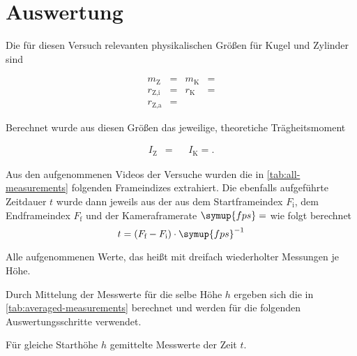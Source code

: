 \section{Auswertung}
\label{sec:Auswertung}


Die für diesen Versuch relevanten physikalischen Größen für Kugel und Zylinder sind 

\begin{align}
  \label{eq:physical-properties}
  m_\text{Z} &=  & m_\text{K} &= \nonumber\\
  r_{\text{Z},\text{i}} &=  & r_\text{K} &= \\
  r_{\text{Z},\text{a}} &=  &&\nonumber
\end{align}

Berechnet wurde aus diesen Größen das jeweilige, theoretiche Trägheitsmoment

\begin{align}
  \label{eq:moments-inertia}
  I_\text{Z} &=  && I_\text{K} = .
\end{align}



Aus den aufgenommenen Videos der Versuche wurden die in \autoref{tab:all-measurements} folgenden Frameindizes extrahiert.
Die ebenfalls aufgeführte Zeitdauer $t$ wurde dann jeweils aus der aus dem Startframeindex $F_\text{i}$,
dem Endframeindex $F_\text{f}$ und der Kameraframerate $\symup{fps}=$ wie folgt 
berechnet
\begin{equation*}
  t = (F_\text{f} - F_\text{i})\cdot\symup{fps}^{-1}
\end{equation*}

\begin{table}
  \centering
  \caption{Alle aufgenommenen Werte, das heißt mit dreifach wiederholter Messungen je Höhe.}
  \label{tab:all-measurements}
  
\end{table}

Durch Mittelung der Messwerte für die selbe Höhe $h$ ergeben sich die in 
\autoref{tab:averaged-measurements} berechnet und werden für die folgenden
Auswertungsschritte verwendet.


\begin{table}
  \centering
  \caption{Für gleiche Starthöhe $h$ gemittelte Messwerte der Zeit $t$.}
  \label{tab:averaged-measurements}
  
\end{table}



